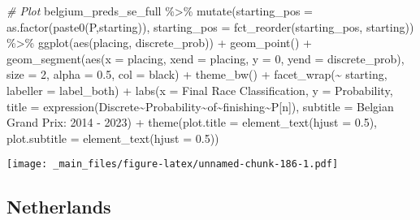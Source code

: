 \documentclass[
]{book}
\newenvironment{Shaded}{\begin{snugshade}}{\end{snugshade}}
\newcommand{\AttributeTok}[1]{\textcolor[rgb]{0.77,0.63,0.00}{#1}}
\newcommand{\CommentTok}[1]{\textcolor[rgb]{0.56,0.35,0.01}{\textit{#1}}}
\newcommand{\DecValTok}[1]{\textcolor[rgb]{0.00,0.00,0.81}{#1}}
\newcommand{\FloatTok}[1]{\textcolor[rgb]{0.00,0.00,0.81}{#1}}
\newcommand{\FunctionTok}[1]{\textcolor[rgb]{0.00,0.00,0.00}{#1}}
\newcommand{\NormalTok}[1]{#1}
\newcommand{\SpecialCharTok}[1]{\textcolor[rgb]{0.00,0.00,0.00}{#1}}
\newcommand{\StringTok}[1]{\textcolor[rgb]{0.31,0.60,0.02}{#1}}
\begin{document}
\begin{Shaded}
\begin{Highlighting}[]
\CommentTok{\# Plot}
\NormalTok{belgium\_preds\_se\_full }\SpecialCharTok{\%\textgreater{}\%}
  \FunctionTok{mutate}\NormalTok{(}\AttributeTok{starting\_pos =} \FunctionTok{as.factor}\NormalTok{(}\FunctionTok{paste0}\NormalTok{(}\StringTok{\textquotesingle{}P\textquotesingle{}}\NormalTok{,starting)),}
         \AttributeTok{starting\_pos =} \FunctionTok{fct\_reorder}\NormalTok{(starting\_pos, starting)) }\SpecialCharTok{\%\textgreater{}\%}
  \FunctionTok{ggplot}\NormalTok{(}\FunctionTok{aes}\NormalTok{(placing, discrete\_prob)) }\SpecialCharTok{+}
  \FunctionTok{geom\_point}\NormalTok{() }\SpecialCharTok{+}
  \FunctionTok{geom\_segment}\NormalTok{(}\FunctionTok{aes}\NormalTok{(}\AttributeTok{x =}\NormalTok{ placing, }\AttributeTok{xend =}\NormalTok{ placing, }\AttributeTok{y =} \DecValTok{0}\NormalTok{, }\AttributeTok{yend =}\NormalTok{ discrete\_prob),}
               \AttributeTok{size =} \DecValTok{2}\NormalTok{, }\AttributeTok{alpha =} \FloatTok{0.5}\NormalTok{, }\AttributeTok{col =} \StringTok{\textquotesingle{}black\textquotesingle{}}\NormalTok{) }\SpecialCharTok{+}
  \FunctionTok{theme\_bw}\NormalTok{() }\SpecialCharTok{+}
  \FunctionTok{facet\_wrap}\NormalTok{(}\SpecialCharTok{\textasciitilde{}}\NormalTok{ starting, }\AttributeTok{labeller =}\NormalTok{ label\_both) }\SpecialCharTok{+}
  \FunctionTok{labs}\NormalTok{(}\AttributeTok{x =} \StringTok{\textquotesingle{}Final Race Classification\textquotesingle{}}\NormalTok{,}
       \AttributeTok{y =} \StringTok{\textquotesingle{}Probability\textquotesingle{}}\NormalTok{,}
       \AttributeTok{title =} \FunctionTok{expression}\NormalTok{(Discrete}\SpecialCharTok{\textasciitilde{}}\NormalTok{Probability}\SpecialCharTok{\textasciitilde{}}\NormalTok{of}\SpecialCharTok{\textasciitilde{}}\NormalTok{finishing}\SpecialCharTok{\textasciitilde{}}\NormalTok{P[n]),}
       \AttributeTok{subtitle =} \StringTok{\textquotesingle{}Belgian Grand Prix: 2014 {-} 2023\textquotesingle{}}\NormalTok{) }\SpecialCharTok{+}
  \FunctionTok{theme}\NormalTok{(}\AttributeTok{plot.title =} \FunctionTok{element\_text}\NormalTok{(}\AttributeTok{hjust =} \FloatTok{0.5}\NormalTok{),}
        \AttributeTok{plot.subtitle =} \FunctionTok{element\_text}\NormalTok{(}\AttributeTok{hjust =} \FloatTok{0.5}\NormalTok{)) }
\end{Highlighting}
\end{Shaded}

\texttt{[image: \_main\_files/figure-latex/unnamed-chunk-186-1.pdf]}

\hypertarget{netherlands}{%
\subsection{Netherlands}\label{netherlands}}
\end{document}
